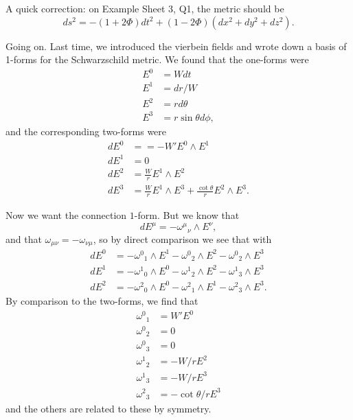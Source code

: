 A quick correction: on Example Sheet 3, Q1, the metric should be
$$ds^2=-(1+2\Phi)dt^2+(1-2\Phi)(dx^2+dy^2+dz^2).$$

Going on. Last time, we introduced the vierbein fields and wrote down a basis of 1-forms for the Schwarzschild metric.
We found that the one-forms were
\begin{align*}
    E^0 &= W dt\\
    E^1 &= dr/W\\
    E^2 &= rd\theta\\
    E^3 &= r\sin\theta d\phi,
\end{align*}
and the corresponding two-forms were
\begin{align*}
    dE^0 &= = -W' E^0 \wedge E^1\\
    dE^1 &= 0\\
    dE^2 &=\frac{W}{r} E^1 \wedge E^2\\
    dE^3 &=  \frac{W}{r} E^1 \wedge E^3 + \frac{\cot \theta}{r} E^2 \wedge E^3.
\end{align*}

Now we want the connection $1$-form. But we know that $$dE^\mu=-\omega^\mu{}_\nu \wedge E^\nu,$$
and that $\omega_{\mu\nu}=-\omega_{\nu\mu}$, so by direct comparison we see that with
\begin{align*}
    dE^0 &= -\omega^0{}_1 \wedge E^1 -\omega^0{}_2 \wedge E^2 -\omega^0{}_2 \wedge E^3\\
    dE^1 &= -\omega^1{}_0 \wedge E^0 -\omega^1{}_2 \wedge E^2 -\omega^1{}_3 \wedge E^3\\
    dE^2 &= -\omega^2{}_0 \wedge E^0 -\omega^2{}_1 \wedge E^1 -\omega^2{}_3 \wedge E^3.
\end{align*}
By comparison to the two-forms, we find that
\begin{align*}
    \omega^0{}_1 &= W' E^0\\
    \omega^0{}_2 &= 0\\
    \omega^0{}_3 &= 0\\
    \omega^1{}_2 &= -W/r E^2\\
    \omega^1{}_3 &= -W/r E^3\\
    \omega^2{}_3 &= -\cot\theta/r E^3
\end{align*}
and the others are related to these by symmetry.

